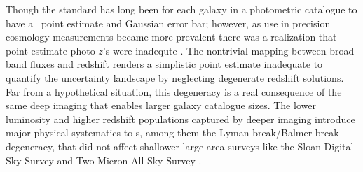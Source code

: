 
Though the standard has long been for each galaxy in a photometric catalogue to have a \pz\ point estimate and Gaussian error bar; however, as use in precision cosmology measurements became more prevalent there was a realization that point-estimate photo-$z$'s were inadequte \citep{mandelbaum:2008}.  The nontrivial mapping between broad band fluxes and redshift renders a simplistic point estimate inadequate to quantify the uncertainty landscape by neglecting degenerate redshift solutions.
Far from a hypothetical situation, this degeneracy is a real consequence of the same deep imaging that enables larger galaxy catalogue sizes.
The lower luminosity and higher redshift populations captured by deeper imaging introduce major physical systematics to \pz s, among them the Lyman break/Balmer break degeneracy, that did not affect shallower large area surveys like the Sloan Digital Sky Survey \citep[\textsc{SDSS},][]{York:00} and Two Micron All Sky Survey \citep[\textsc{2MASS},][]{Skrutskie:06}.

